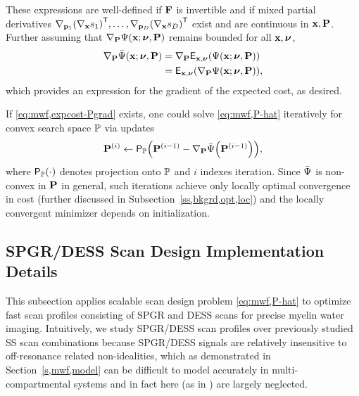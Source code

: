 These expressions are well-defined 
if $\mathbf{F}$ is invertible 
and if mixed partial derivatives
$\grada{\bmp_1}{\paren{\grada{\bmx}{s_1}}\tpose},
\dots,
\grada{\bmp_D}{\paren{\grada{\bmx}{s_D}}\tpose}$
exist and are continuous in $\mathbf{x},\mathbf{P}$. 
Further assuming 
that $\grada{\bmP}{\costa{\bmx; \bmnu, \bmP}}$ remains bounded 
for all $\mathbf{x},\boldsymbol{\nu}$, 
\begin{align}
	\grada{\bmP}{\expcost\paren{\bmx; \bmnu, \bmP}} 
		&= 
		\grada{\bmP}{\expect{\bmx,\bmnu}{\costa{\bmx; \bmnu, \bmP}}}
		\nonumber \\
		&= 
		\expect{\bmx,\bmnu}{\grada{\bmP}{\costa{\bmx; \bmnu, \bmP}}},
		\label{eq:mwf,expcost-Pgrad}
\end{align} 
which provides an expression
for the gradient of the expected cost,
as desired.

If \eqref{eq:mwf,expcost-Pgrad} exists,
one could solve \eqref{eq:mwf,P-hat} iteratively
for convex search space $\mathbb{P}$
via updates
\begin{align}
	\iter{\bmP}{i} \gets 
		\proja{\setP}{\iter{\bmP}{i-1}-\grada{\bmP}{\expcost\paren{\iter{\bmP}{i-1}}}},
		\label{eq:mwf,P-iter}
\end{align}
where $\proja{\setP}{\cdot}$ denotes projection onto $\mathbb{P}$
and $i$ indexes iteration.
Since $\bar{\Psi}$ is non-convex in $\mathbf{P}$ in general,
such iterations achieve
only locally optimal convergence in cost
(further discussed in Subsection~\ref{ss,bkgrd,opt,loc})
and the locally convergent minimizer
depends on initialization.

\subsection{SPGR/DESS Scan Design Implementation Details}
\label{ss,mwf,acq,detail}

This subsection applies 
scalable scan design problem \eqref{eq:mwf,P-hat}
to optimize fast scan profiles 
consisting of SPGR and DESS scans
for precise myelin water imaging.
Intuitively,
we study SPGR/DESS scan profiles
over previously studied SS scan combinations
\cite{deoni:08:gmt, deoni:11:com, deoni:13:oct}
because SPGR/DESS signals
are relatively insensitive
to off-resonance related non-idealities,
which as demonstrated 
in Section~\ref{s,mwf,model}
can be difficult
to model accurately 
in multi-compartmental systems
and in fact here 
(as in \cite{deoni:11:com, deoni:13:oct})
are largely neglected.

